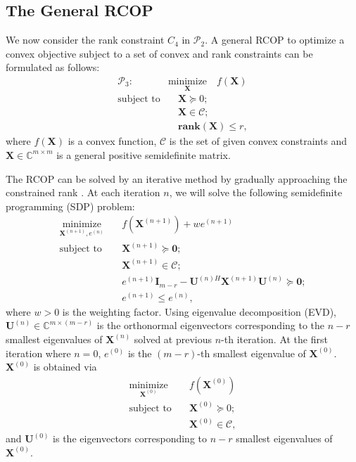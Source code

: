 \documentclass[10pt,journal,twocolumn,twoside]{IEEEtran}
\begin{document}
\subsection{The General RCOP}
We now consider the rank constraint $C_4$ in $\mathcal{P}_2$. A general RCOP to optimize a convex objective subject to a set of convex and rank constraints can be formulated as follows:
\begin{align}\label{eq:RCOP}
\mathcal{P}_3: \quad& \underset{\bm{X}}{\text{minimize}}   \quad f(\bm{X}) \\
\text{subject to}& \quad \bm{X} \succeq 0;\nonumber\\
& \quad \bm{X} \in \mathcal{C}; \nonumber\\
& \quad \textbf{rank}(\bm{X})\leq r, \nonumber
\end{align}
where $f(\bm{X})$ is a convex function, $\mathcal{C}$ is the set of given convex constraints and $\bm{X}\in \mathbb{C}^{m\times m}$ is a general positive semidefinite matrix.

The RCOP can be solved by an iterative method by gradually approaching the constrained rank \cite{sun2017rank}. At each iteration $n$, we will solve the following semidefinite programming (SDP) problem:
\begin{align} \label{rank}
\underset{\bm{X}^{(n+1)}, e^{(n)}}{\text{minimize}}  & \quad f(\bm{X}^{(n+1)})  + w e^{(n+1)} \\
\text{subject to}& \quad \bm{X}^{(n+1)} \succeq \bm{0};\nonumber\\
& \quad \bm{X}^{(n+1)}\in \mathcal{C}; \nonumber\\
&\quad e^{(n+1)}\bm{I}_{m-r} - \bm{U}^{(n)H} \bm{X}^{(n+1)} \bm{U}^{(n)} \succeq \bm{0};\nonumber\\
&\quad e^{(n+1)} \leq e^{(n)},\nonumber
\end{align}
where $w > 0$ is the weighting factor. Using eigenvalue decomposition (EVD), $\bm{U}^{(n)} \in \mathbb{C}^{{m}\times (m-r)}$ is the orthonormal eigenvectors corresponding to the $n-r$ smallest eigenvalues of $\bm{X}^{(n)}$ solved at previous $n$-th iteration. At the first iteration where $n=0$, $e^{(0)}$ is the $(m-r)$-th smallest eigenvalue of $\bm{X}^{(0)}$. $\bm{X}^{(0)}$ is obtained via
\begin{align} \label{x0}
\underset{{\bm{X}^{(0)}}}{\text{minimize}} & \quad f(\bm{X}^{(0)}) \\
\text{subject to}& \quad \bm{X}^{(0)} \succeq 0;\nonumber\\
& \quad \bm{X}^{(0)}\in \mathcal{C}, \nonumber
\end{align}
and $\bm{U}^{(0)}$ is the eigenvectors corresponding to $n-r$ smallest eigenvalues of $\bm{X}^{(0)}$.
\end{document}
